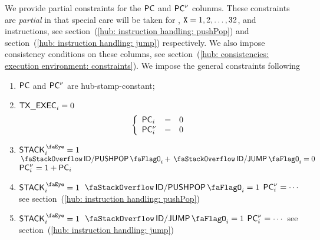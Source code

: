 We provide partial constraints for the $\textsf{PC}$ and $\textsf{PC}^{\nu}$ colunms.
These constraints are \emph{partial} in that special care will be taken for , $\texttt{X} = 1, 2, \dots, 32$, and  instructions, see
section~(\ref{hub: instruction handling: pushPop}) and
section~(\ref{hub: instruction handling: jump}) respectively.
We also impose consistency conditions on these columns, see
section~(\ref{hub: consistencies: execution environment: constraints}).
We impose the general constraints following
\begin{enumerate}
	\item $\textsf{PC}$ and $\textsf{PC}^{\nu}$ are hub-stamp-constant;
	\item \If $\textsf{TX}\textsf{\_EXEC}_{i} = 0$ \Then
		\[
			\left\{ \begin{array}{lcl}
				\textsf{PC}_{i}     & = & 0 \\
				\textsf{PC}^{\nu}_{i} & = & 0 \\
			\end{array} \right.
		\]
	\item \If $\peekStack_{i} = 1$ \et $\stackDecPushPopFlag_{i} + \stackDecJumpFlag_{i} = 0$ \Then $\textsf{PC}^{\nu}_{i} = 1 + \textsf{PC}_{i}$
	\item \If $\peekStack_{i} = 1$ \et $\stackDecPushPopFlag_{i}                         = 1$ \Then $\textsf{PC}^{\nu}_{i} = \cdots$ see section~(\ref{hub: instruction handling: pushPop})
	\item \If $\peekStack_{i} = 1$ \et $                           \stackDecJumpFlag_{i} = 1$ \Then $\textsf{PC}^{\nu}_{i} = \cdots$ see section~(\ref{hub: instruction handling: jump})
\end{enumerate}
